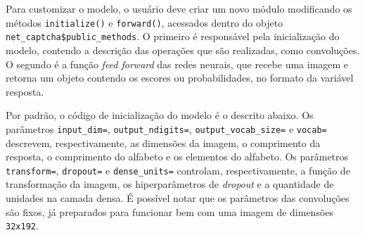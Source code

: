 \documentclass[12pt,twoside,brazilian]{book}
\begin{document}
Para customizar o modelo, o usuário deve criar um novo módulo
modificando os métodos \texttt{initialize()} e \texttt{forward()},
acessados dentro do objeto \texttt{net\_captcha\$public\_methods}. O
primeiro é responsável pela inicialização do modelo, contendo a
descrição das operações que são realizadas, como convoluções. O segundo
é a função \emph{feed forward} das redes neurais, que recebe uma imagem
e retorna um objeto contendo os escores ou probabilidades, no formato da
variável resposta.

Por padrão, o código de inicialização do modelo é o descrito abaixo. Os
parâmetros \texttt{input\_dim=}, \texttt{output\_ndigits=},
\texttt{output\_vocab\_size=} e \texttt{vocab=} descrevem,
respectivamente, as dimensões da imagem, o comprimento da resposta, o
comprimento do alfabeto e os elementos do alfabeto. Os parâmetros
\texttt{transform=}, \texttt{dropout=} e \texttt{dense\_units=}
controlam, respectivamente, a função de transformação da imagem, os
hiperparâmetros de \emph{dropout} e a quantidade de unidades na camada
densa. É possível notar que os parâmetros das convoluções são fixos, já
preparados para funcionar bem com uma imagem de dimensões
\texttt{32x192}.
\end{document}
